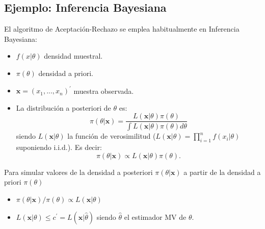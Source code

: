 \documentclass[
]{book}
\newenvironment{Shaded}{\begin{snugshade}}{\end{snugshade}}
\newcommand{\CommentTok}[1]{\textcolor[rgb]{0.56,0.35,0.01}{\textit{#1}}}
\newcommand{\ControlFlowTok}[1]{\textcolor[rgb]{0.13,0.29,0.53}{\textbf{#1}}}
\newcommand{\DataTypeTok}[1]{\textcolor[rgb]{0.13,0.29,0.53}{#1}}
\newcommand{\DecValTok}[1]{\textcolor[rgb]{0.00,0.00,0.81}{#1}}
\newcommand{\FloatTok}[1]{\textcolor[rgb]{0.00,0.00,0.81}{#1}}
\newcommand{\KeywordTok}[1]{\textcolor[rgb]{0.13,0.29,0.53}{\textbf{#1}}}
\newcommand{\NormalTok}[1]{#1}
\newcommand{\OperatorTok}[1]{\textcolor[rgb]{0.81,0.36,0.00}{\textbf{#1}}}
\newcommand{\StringTok}[1]{\textcolor[rgb]{0.31,0.60,0.02}{#1}}
\theoremstyle{break}
\theoremstyle{definition}
\theoremstyle{definition}
\theoremstyle{definition}
\theoremstyle{remark}
\begin{document}
\begin{enumerate}
\begin{Shaded}
\end{Shaded}
\end{enumerate}

\hypertarget{ejemplo-inferencia-bayesiana}{%
\subsection{Ejemplo: Inferencia Bayesiana}\label{ejemplo-inferencia-bayesiana}}

El algoritmo de Aceptación-Rechazo se emplea habitualmente en
Inferencia Bayesiana:

\begin{itemize}
\item
  \(f(x|\theta )\) densidad muestral.
\item
  \(\pi (\theta )\) densidad a priori.
\item
  \(\mathbf{x}=(x_{1},...,x_n)^{\prime }\) muestra observada.
\item
  La distribución a posteriori de \(\theta\) es:
  \[\pi (\theta |\mathbf{x})=\frac{L(\mathbf{x}|\theta )\pi (\theta )}
  {\int L(\mathbf{x}|\theta )\pi (\theta )d\theta }\]
  siendo \(L(\mathbf{x}|\theta )\) la función de verosimilitud
  (\(L(\mathbf{x}|\theta )=\prod\limits_{i=1}^{n}f(x_{i}|\theta)\)
  suponiendo i.i.d.). Es decir:
  \[\pi (\theta |\mathbf{x})\propto L(\mathbf{x}|\theta )\pi (\theta ).\]
\end{itemize}

Para simular valores de la densidad a posteriori \(\pi (\theta | \mathbf{x})\)
a partir de la densidad a priori \(\pi (\theta )\)

\begin{itemize}
\item
  \(\pi (\theta |\mathbf{x})/\pi (\theta )\propto L(\mathbf{x}|\theta )\)
\item
  \(L(\mathbf{x}|\theta )\leq c^{\prime }=L(\mathbf{x}|\hat{\theta})\) siendo
  \(\hat{\theta}\) el estimador MV de \(\theta\).
\end{itemize}
\end{document}
